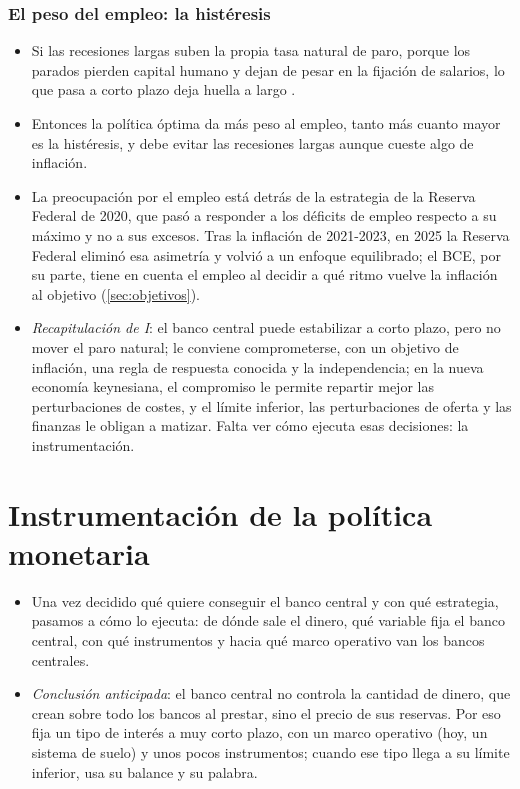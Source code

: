\documentclass[11pt]{article}
\begin{document}
\subsubsection{El peso del empleo: la histéresis}\label{sec:histeresis}

\begin{itemize}
\item Si las recesiones largas suben la propia tasa natural de paro, porque los parados pierden capital humano y dejan de pesar en la fijación de salarios, lo que pasa a corto plazo deja huella a largo\nocite{BlanchardSummers1986Hysteresis} .
\item Entonces la política óptima da más peso al empleo, tanto más cuanto mayor es la histéresis, y debe evitar las recesiones largas aunque cueste algo de inflación\nocite{Gali2022Insider}.
\item La preocupación por el empleo está detrás de la estrategia de la Reserva Federal de 2020, que pasó a responder a los déficits de empleo respecto a su máximo y no a sus excesos\nocite{Fed2020Prensa}. Tras la inflación de 2021-2023, en 2025 la Reserva Federal eliminó esa asimetría y volvió a un enfoque equilibrado\nocite{Fed2025Prensa}; el BCE, por su parte, tiene en cuenta el empleo al decidir a qué ritmo vuelve la inflación al objetivo (\ref{sec:objetivos}).
\end{itemize}

\begin{itemize}
\item \emph{Recapitulación de I}: el banco central puede estabilizar a corto plazo, pero no mover el paro natural; le conviene comprometerse, con un objetivo de inflación, una regla de respuesta conocida y la independencia; en la nueva economía keynesiana, el compromiso le permite repartir mejor las perturbaciones de costes, y el límite inferior, las perturbaciones de oferta y las finanzas le obligan a matizar. Falta ver cómo ejecuta esas decisiones: la instrumentación.
\end{itemize}


\section{Instrumentación de la política monetaria}\label{sec:instrumentacion}

\begin{itemize}
\item Una vez decidido qué quiere conseguir el banco central y con qué estrategia, pasamos a cómo lo ejecuta: de dónde sale el dinero, qué variable fija el banco central, con qué instrumentos y hacia qué marco operativo van los bancos centrales.
\item \emph{Conclusión anticipada}: el banco central no controla la cantidad de dinero, que crean sobre todo los bancos al prestar, sino el precio de sus reservas. Por eso fija un tipo de interés a muy corto plazo, con un marco operativo (hoy, un sistema de suelo) y unos pocos instrumentos; cuando ese tipo llega a su límite inferior, usa su balance y su palabra.
\end{itemize}
\end{document}
